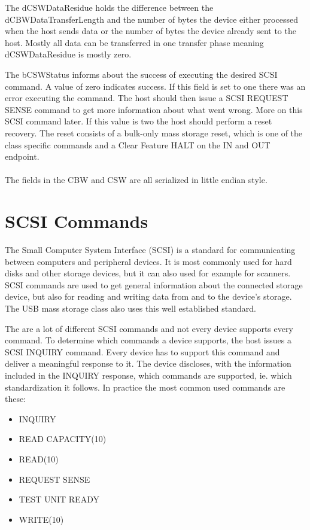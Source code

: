 \newpage

The dCSWDataResidue holds the difference between the dCBWDataTransferLength and the number of bytes the device either processed when the host sends data or the number of bytes the device already sent to the host. Mostly all data can be transferred in one transfer phase meaning dCSWDataResidue is mostly zero.

The bCSWStatus informs about the success of executing the desired SCSI command. A value of zero indicates success. If this field is set to one there was an error executing the command. The host should then issue a SCSI REQUEST SENSE command to get more information about what went wrong\cite{usb_ms_jan}. More on this SCSI command later. If this value is two the host should perform a reset recovery. The reset consists of a bulk-only mass storage reset, which is one of the class specific commands and a Clear Feature HALT on the IN and OUT endpoint\cite{usb_ms_jan, usb_mass_bulk}.
\\\\
The fields in the CBW and CSW are all serialized in little endian style.

\section{SCSI Commands}

The Small Computer System Interface (SCSI) is a standard for communicating between computers and peripheral devices. It is most commonly used for hard disks and other storage devices, but it can also used for example for scanners\cite{wiki_scsi}. SCSI commands are used to get general information about the connected storage device, but also for reading and writing data from and to the device's storage. The USB mass storage class also uses this well established standard.

The are a lot of different SCSI commands and not every device supports every command. To determine which commands a device supports, the host issues a SCSI INQUIRY command. Every device has to support this command and deliver a meaningful response to it. The device discloses, with the information included in the INQUIRY response, which commands are supported, ie. which standardization it follows. In practice the most common used commands are these\cite{usb_ms_jan}:

\begin{itemize}
\item INQUIRY
\item READ CAPACITY(10)
\item READ(10)
\item REQUEST SENSE
\item TEST UNIT READY
\item WRITE(10)
\end{itemize}

